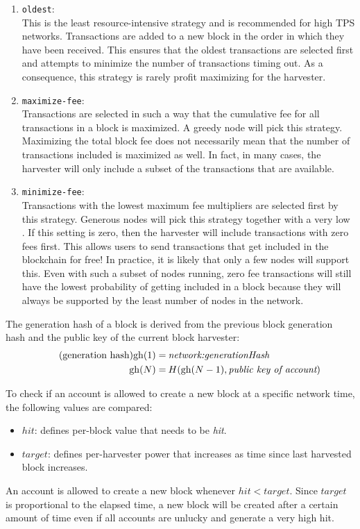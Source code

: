 \begin{enumerate}
\item{\texttt{oldest}: \\
This is the least resource-intensive strategy and is recommended for high TPS networks.
Transactions are added to a new block in the order in which they have been received.
This ensures that the oldest transactions are selected first and attempts to minimize the number of transactions timing out.
As a consequence, this strategy is rarely profit maximizing for the harvester.}
\item{\texttt{maximize-fee}: \\
Transactions are selected in such a way that the cumulative fee for all transactions in a block is maximized.
A greedy node will pick this strategy.
Maximizing the total block fee does not necessarily mean that the number of transactions included is maximized as well.
In fact, in many cases, the harvester will only include a subset of the transactions that are available.}
\item{\texttt{minimize-fee}: \\
Transactions with the lowest maximum fee multipliers are selected first by this strategy.
Generous nodes will pick this strategy together with a very low  .
If this setting is zero, then the harvester will include transactions with zero fees first.
This allows users to send transactions that get included in the blockchain for free!
In practice, it is likely that only a few nodes will support this.
Even with such a subset of nodes running, zero fee transactions will still have the lowest probability of getting included in a block because they will always be supported by the least number of nodes in the network.}
\end{enumerate}


The generation hash of a block is derived from the previous block generation hash and the public key of the current block harvester:
\begin{align*}
\tag{generation hash}
\mathfunc{gh}(1) = \: & \nemsetting{network}{generationHash} \\
\mathfunc{gh}(N) = \: & H(\mathfunc{gh}(N - 1), \textit{public key of account})
\end{align*}

To check if an account is allowed to create a new block at a specific network time, the following values are compared:
\begin{itemize}
\item{ $hit$: defines per-block value that needs to be \textit{hit}.}
\item{ $target$: defines per-harvester power that increases as time since last harvested block increases.}
\end{itemize}
An account is allowed to create a new block whenever $\mathit{hit} < \mathit{target}$.
Since $\mathit{target}$ is proportional to the elapsed time, a new block will be created after a certain amount of time even if all accounts are unlucky and generate a very high hit.

